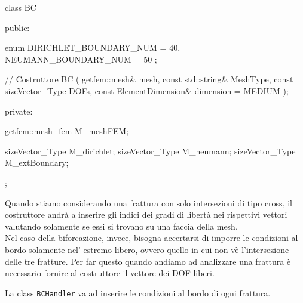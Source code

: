 \begin{Code03_03}[caption={Classe \texttt{BC}}]
class BC
{
 public:

    enum
    {
        DIRICHLET_BOUNDARY_NUM = 40,
        NEUMANN_BOUNDARY_NUM = 50
    };

    // Costruttore
    BC ( getfem::mesh& mesh,
         const std::string& MeshType,
         const sizeVector_Type DOFs,
         const ElementDimension& dimension = MEDIUM );

 private:

    getfem::mesh_fem M_meshFEM;
    
    sizeVector_Type M_dirichlet;
    sizeVector_Type M_neumann;
    sizeVector_Type M_extBoundary;   
};
\end{Code03_03}

Quando stiamo considerando una frattura con solo intersezioni di tipo cross, il costruttore andrà a inserire gli indici dei gradi di libert\`{a} nei rispettivi vettori valutando solamente se essi si trovano su una faccia della mesh.\\
Nel caso della biforcazione, invece, bisogna accertarsi di imporre le condizioni al bordo solamente nel' estremo libero, ovvero quello in cui non v\`{e} l'intersezione delle tre fratture.
%
Per far questo quando andiamo ad analizzare una frattura \`{e} necessario fornire al costruttore il vettore dei DOF liberi.

La class \texttt{BCHandler} va ad inserire le condizioni al bordo di ogni frattura.

